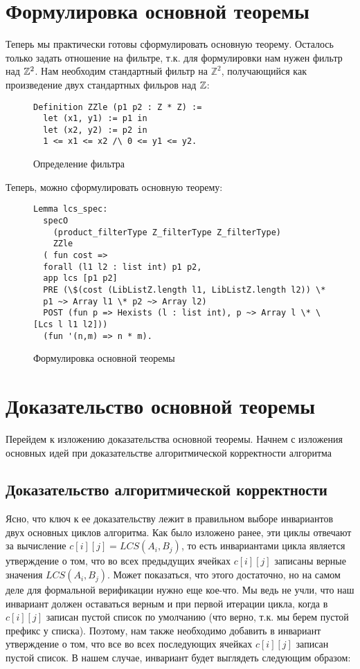 \section{Формулировка основной теоремы}
Теперь мы практически готовы сформулировать основную теорему. Осталось только задать отношение на фильтре, т.к. для формулировки
нам нужен фильтр над $\mathbb{Z}^2$. Нам необходим стандартный фильтр на $\mathbb{Z}^2$, получающийся как произведение двух
стандартных фильров над $\mathbb{Z}$:

\begin{figure}[H]
  \caption{Определение фильтра}
  \label{code:filter_definition}
  \begin{verbatim}
Definition ZZle (p1 p2 : Z * Z) :=
  let (x1, y1) := p1 in
  let (x2, y2) := p2 in
  1 <= x1 <= x2 /\ 0 <= y1 <= y2.
  \end{verbatim}
\end{figure}

Теперь, можно сформулировать основную теорему:
\begin{figure}[H]
  \caption{Формулировка основной теоремы}
  \label{code:main_result_definition}
  \begin{verbatim}
Lemma lcs_spec:
  specO
    (product_filterType Z_filterType Z_filterType)
    ZZle
  ( fun cost =>
  forall (l1 l2 : list int) p1 p2,
  app lcs [p1 p2]
  PRE (\$(cost (LibListZ.length l1, LibListZ.length l2)) \*
  p1 ~> Array l1 \* p2 ~> Array l2)
  POST (fun p => Hexists (l : list int), p ~> Array l \* \[Lcs l l1 l2]))
  (fun '(n,m) => n * m).
  \end{verbatim}
\end{figure}


\section{Доказательство основной теоремы}
Перейдем к изложению доказательства основной теоремы. Начнем с изложения основных идей при доказательстве алгоритмической корректности
алгоритма
\subsection{Доказательство алгоритмической корректности}
Ясно, что ключ к ее доказательству лежит в правильном выборе инвариантов
двух основных циклов алгоритма. Как было изложено ранее, эти циклы отвечают за вычисление $c[i][j] = LCS(A_i, B_j)$, то есть
инвариантами цикла является утверждение о том, что во всех предыдущих ячейках $c[i][j]$ записаны верные значения $LCS(A_i, B_j)$.
Может показаться, что этого достаточно, но на самом деле для формальной верификации нужно еще кое-что. Мы ведь не учли, что наш инвариант
должен оставаться верным и при первой итерации цикла, когда в $c[i][j]$ записан пустой список по умолчанию
(что верно, т.к. мы берем пустой префикс у списка). Поэтому, нам также необходимо добавить в инвариант утверждение о том, что все во
всех последующих ячейках $c[i][j]$ записан пустой список. В нашем случае, инвариант будет выглядеть следующим образом:

